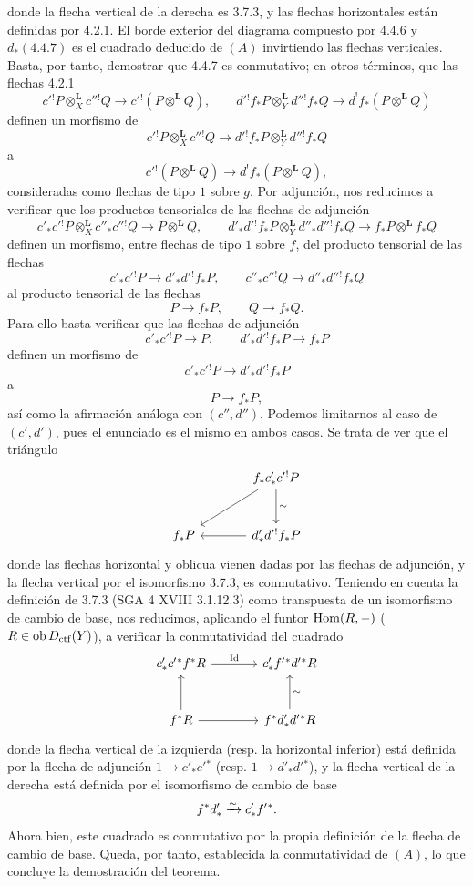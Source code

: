 \begin{prooftext}[Demostración]
donde la flecha vertical de la derecha es 3.7.3, y las flechas horizontales están definidas por 4.2.1. El borde exterior del diagrama compuesto por 4.4.6 y $d_*(4.4.7)$ es el cuadrado deducido de $(A)$ invirtiendo las flechas verticales. Basta, por tanto, demostrar que 4.4.7 es conmutativo; en otros términos, que las flechas 4.2.1
\[
c'{}^!P\otimes_X^{\mathbf L}c''{}^!Q\longrightarrow c'{}^!(P\otimes^{\mathbf L}Q),\qquad
d'{}^!f_*P\otimes_Y^{\mathbf L}d''{}^!f_*Q\longrightarrow d^!f_*(P\otimes^{\mathbf L}Q)
\]
definen un morfismo de
\[
c'{}^!P\otimes_X^{\mathbf L}c''{}^!Q\longrightarrow d'{}^!f_*P\otimes_Y^{\mathbf L}d''{}^!f_*Q
\]
a
\[
c'{}^!(P\otimes^{\mathbf L}Q)\longrightarrow d^!f_*(P\otimes^{\mathbf L}Q),
\]
consideradas como flechas de tipo $1$ sobre $g$. Por adjunción, nos reducimos a verificar que los productos tensoriales de las flechas de adjunción
\[
c'_*c'{}^!P\otimes_X^{\mathbf L}c''_*c''{}^!Q\longrightarrow P\otimes^{\mathbf L}Q,
\qquad
d'_*d'{}^!f_*P\otimes_Y^{\mathbf L}d''_*d''{}^!f_*Q
\longrightarrow f_*P\otimes^{\mathbf L}f_*Q
\]
definen un morfismo, entre flechas de tipo $1$ sobre $f$, del producto tensorial de las flechas
\[
c'_*c'{}^!P\longrightarrow d'_*d'{}^!f_*P,\qquad
c''_*c''{}^!Q\longrightarrow d''_*d''{}^!f_*Q
\]
al producto tensorial de las flechas
\[
P\longrightarrow f_*P,\qquad Q\longrightarrow f_*Q.
\]
Para ello basta verificar que las flechas de adjunción
\[
c'_*c'{}^!P\longrightarrow P,\qquad d'_*d'{}^!f_*P\longrightarrow f_*P
\]
definen un morfismo de
\[
c'_*c'{}^!P\longrightarrow d'_*d'{}^!f_*P
\]
a
\[
P\longrightarrow f_*P,
\]
así como la afirmación análoga con $(c'',d'')$. Podemos limitarnos al caso de $(c',d')$, pues el enunciado es el mismo en ambos casos. Se trata de ver que el triángulo
\[
\begin{tikzcd}[column sep=large,row sep=large]
& f_*c'_*c'{}^!P \arrow[d,"\sim"]\arrow[dl]\\
f_*P & d'_*d'{}^!f_*P\arrow[l]
\end{tikzcd}
\]
donde las flechas horizontal y oblicua vienen dadas por las flechas de adjunción, y la flecha vertical por el isomorfismo 3.7.3, es conmutativo. Teniendo en cuenta la definición de 3.7.3 (SGA 4 XVIII 3.1.12.3) como transpuesta de un isomorfismo de cambio de base, nos reducimos, aplicando el funtor $\operatorname{Hom}(R,-)$ ($R\in\operatorname{ob}D_{\mathrm{ctf}}(Y)$), a verificar la conmutatividad del cuadrado
\[
\begin{tikzcd}[column sep=large,row sep=large]
c'_*c'{}^*f^*R \arrow[r,"\Id"] &
c'_*f'{}^*d'{}^*R\\
f^*R \arrow[u] \arrow[r] &
f^*d'_*d'{}^*R\arrow[u,"\sim"']
\end{tikzcd}
\]
donde la flecha vertical de la izquierda (resp. la horizontal inferior) está definida por la flecha de adjunción $1\longrightarrow c'_*c'{}^*$ (resp. $1\longrightarrow d'_*d'{}^*$), y la flecha vertical de la derecha está definida por el isomorfismo de cambio de base
\[
f^*d'_*\xrightarrow{\sim} c'_*f'{}^*.
\]
Ahora bien, este cuadrado es conmutativo por la propia definición de la flecha de cambio de base. Queda, por tanto, establecida la conmutatividad de $(A)$, lo que concluye la demostración del teorema.
\end{prooftext}
